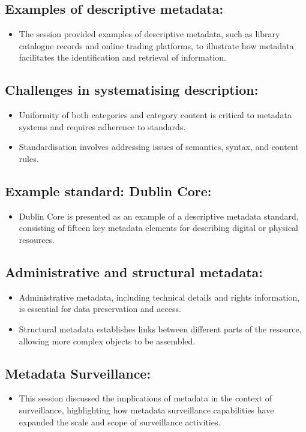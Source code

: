 \documentclass{article}
\begin{document}
\subsection*{Examples of descriptive metadata:}
\begin{itemize}
    \item The session provided examples of descriptive metadata, such as library catalogue records and online trading platforms, to illustrate how metadata facilitates the identification and retrieval of information.
\end{itemize}

\subsection*{Challenges in systematising description:}
\begin{itemize}
    \item Uniformity of both categories and category content is critical to metadata systems and requires adherence to standards.
    \item Standardisation involves addressing issues of semantics, syntax, and content rules.
\end{itemize}

\subsection*{Example standard: Dublin Core:}
\begin{itemize}
    \item Dublin Core is presented as an example of a descriptive metadata standard, consisting of fifteen key metadata elements for describing digital or physical resources.
\end{itemize}

\subsection*{Administrative and structural metadata:}
\begin{itemize}
    \item Administrative metadata, including technical details and rights information, is essential for data preservation and access.
    \item Structural metadata establishes links between different parts of the resource, allowing more complex objects to be assembled.
\end{itemize}

\subsection*{Metadata Surveillance:}
\begin{itemize}
    \item This session discussed the implications of metadata in the context of surveillance, highlighting how metadata surveillance capabilities have expanded the scale and scope of surveillance activities.
\end{itemize}
\end{document}
